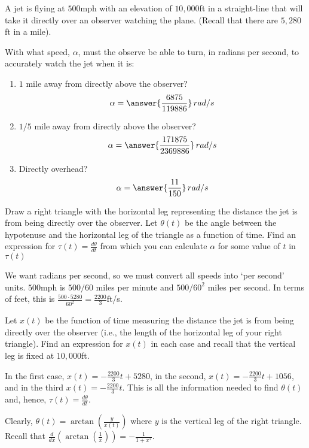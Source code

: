 \documentclass{ximera}
\author{Gregory Hartman \and Matthew Carr}
\begin{document}
\begin{exercise}



A jet is flying at $500$mph with an elevation of $10,000$ft in a straight-line that will take it directly over an observer watching the plane. (Recall that there are $5,280$ft in a mile).

With what speed, $\alpha$, must the observe be able to turn, in radians per second, to accurately watch the jet when it is:
\begin{enumerate}
\item		$1$ mile away from directly above the observer? \[\alpha=\answer{\frac{6875}{119886}}\,rad/s\]
\item		$1/5$ mile away from directly above the observer? \[\alpha=\answer{\frac{171875}{2369886}}\,rad/s\]
\item		Directly overhead? \[\alpha=\answer{\frac{11}{150}}\,rad/s\]
\end{enumerate}

\begin{hint}
Draw a right triangle with the horizontal leg representing the distance the jet is from being directly over the observer. Let $\theta(t)$ be the angle between the hypotenuse and the horizontal leg of the triangle as a function of time. Find an expression for $\tau(t)=\frac{d\theta}{dt}$ from which you can calculate $\alpha$ for some value of $t$ in $\tau(t)$
\end{hint}
\begin{hint}
We want radians per second, so we must convert all speeds into `per second' units. $500$mph is $500/{60}$ miles per minute and $500/{60^2}$ miles per second. In terms of feet, this is $\frac{500\cdot5280}{60^2}=\frac{2200}{3}$ft/s. 
\end{hint}
\begin{hint}
Let $x(t)$ be the function of time measuring the distance the jet is from being directly over the observer (i.e., the length of the horizontal leg of your right triangle). Find an expression for $x(t)$ in each case and recall that the vertical leg is fixed at $10,000$ft.
\end{hint}
\begin{hint}
In the first case, $x(t)=-\frac{2200}{3}t+5280$, in the second, $x(t)=-\frac{2200}{3}t+1056$, and in the third $x(t)=-\frac{2200}{3}t$. This is all the information needed to find $\theta(t)$ and, hence, $\tau(t)=\frac{d\theta}{dt}$.
\end{hint}
\begin{hint}
Clearly, $\theta(t)=\arctan(\frac{y}{x(t)})$ where $y$ is the vertical leg of the right triangle. Recall that $\frac{d}{dx}(\arctan(\frac{1}{x}))=-\frac{1}{1+x^2}$.


\end{hint}
\end{exercise}
\end{document}
